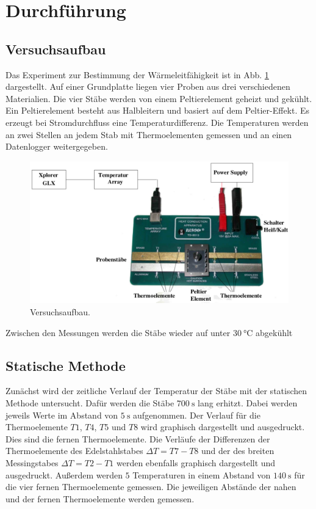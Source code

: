 \section{Durchführung}
\label{sec:Durchführung}

\subsection{Versuchsaufbau}
Das Experiment zur Bestimmung der Wärmeleitfähigkeit ist in Abb. \ref{fig:versuch} dargestellt. 
Auf einer Grundplatte liegen vier Proben aus drei verschiedenen Materialien. 
Die vier Stäbe werden von einem Peltierelement geheizt und gekühlt.
Ein Peltierelement besteht aus Halbleitern und basiert auf dem Peltier-Effekt.
Es erzeugt bei Stromdurchfluss eine Temperaturdifferenz.
Die Temperaturen werden an zwei Stellen an jedem Stab mit 
Thermoelementen gemessen und an einen Datenlogger weitergegeben.
\begin{figure}
    \centering
    \includegraphics[scale=0.2]{build/aufbau.png}
    \caption{Versuchsaufbau.}
    \label{fig:versuch}
\end{figure}

\noindent Zwischen den Messungen werden die Stäbe wieder auf unter $\SI{30}{\degreeCelsius}$ abgekühlt

\subsection{Statische Methode}
Zunächst wird der zeitliche Verlauf der Temperatur der Stäbe 
mit der statischen Methode untersucht.
Dafür werden die Stäbe $\SI{700}{\second}$ lang erhitzt.
Dabei werden jeweils Werte im Abstand von $\SI{5}{\second}$ aufgenommen.
Der Verlauf für die Thermoelemente
$T1$, $T4$, $T5$ und $T8$ wird graphisch dargestellt und ausgedruckt.
Dies sind die fernen Thermoelemente.
Die Verläufe der Differenzen der Thermoelemente des Edelstahlstabes $\Delta T = T7 - T8$ %
und der des breiten Messingstabes $\Delta T = T2 - T1$ werden ebenfalls graphisch dargestellt und %
ausgedruckt.
Außerdem werden $\num{5}$ Temperaturen in einem Abstand von $\SI{140}{\second}$
für die vier fernen Thermoelemente gemessen.
Die jeweiligen Abstände der nahen und der fernen Thermoelemente werden gemessen.

